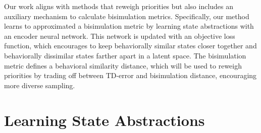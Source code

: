 Our work aligns with methods that reweigh priorities but also includes an auxiliary mechanism to calculate bisimulation metrics. Specifically, our method learns to approximated a bisimulation metric by learning state abstractions with an encoder neural network. This network is updated with an objective loss function, which encourages to keep behaviorally similar states closer together and behaviorally dissimilar states farther apart in a latent space. The bisimulation metric defines a behavioral similarity distance, which will be used to reweigh priorities by trading off between TD-error and bisimulation distance, encouraging more diverse sampling.





\section{Learning State Abstractions}


